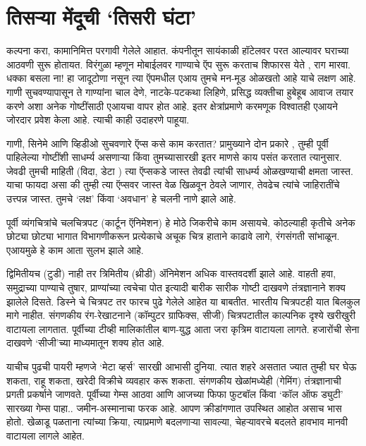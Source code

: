 \chapter{तिसऱ्या मेंदूची `तिसरी घंटा'}

कल्पना करा, कामानिमित्त परगावी गेलेले आहात. कंपनीतून सायंकाळी हॉटेलवर परत आल्यावर घराच्या आठवणी सुरू होतायत. विरंगुळा म्हणून मोबाईलवर गाण्याचे ऍप सुरू करताच शिफारस येते , राग मारवा.  धक्का बसला ना! हा जादूटोणा नसून त्या ऍपमधील एआय तुमचे मन-मूड ओळखतो आहे याचे लक्षण आहे. गाणी सुचवण्यापासून ते गाण्यांना चाल देणे, नाटके-पटकथा लिहिणे, प्रसिद्ध व्यक्तीचा हुबेहूब आवाज तयार करणे अशा अनेक गोष्टींसाठी एआयचा वापर होत आहे. इतर क्षेत्रांप्रमाणे करमणूक विश्वातही एआयने जोरदार प्रवेश केला आहे. त्याची काही उदाहरणे पाहूया.

गाणी, सिनेमे आणि व्हिडीओ सुचवणारे ऍप्स कसे काम करतात? प्रामुख्याने दोन प्रकारे , तुम्ही पूर्वी पाहिलेल्या गोष्टींशी साधर्म्य असणाऱ्या किंवा तुमच्यासारखी इतर माणसे काय पसंत करतात त्यानुसार. जेवढी तुमची माहिती (विदा, डेटा ) त्या ऍप्सकडे जास्त तेवढी त्यांची साधर्म्य ओळखण्याची क्षमता जास्त. याचा फायदा असा की तुम्ही त्या ऍप्सवर जास्त वेळ खिळवून ठेवले जाणार, तेवढेच त्यांचे जाहिरातींचे उत्त्पन्न जास्त. तुमचे `लक्ष' किंवा `अवधान' हे चलनी नाणे झाले आहे.  

पूर्वी व्यंगचित्रांचे चलचित्रपट (कार्टून ऍनिमेशन) हे मोठे जिकरीचे काम असायचे. कोठल्याही कृतीचे अनेक छोट्या छोट्या भागात विभागणीकरून प्रत्येकाचे अचूक चित्र हाताने काढावे लागे, रंगसंगती सांभाळून. एआयमुळे हे काम आता सुलभ झाले आहे. 

द्विमितीयच (टुडी) नाही तर त्रिमितीय (थ्रीडी) ॲनिमेशन अधिक वास्तवदर्शी झाले आहे. वाहती हवा, समुद्राच्या पाण्याचे तुषार, प्राण्यांच्या त्वचेचा पोत इत्यादी बारीक सारीक गोष्टी दाखवणे तंत्रज्ञानाने शक्य झालेले दिसते. डिस्ने चे चित्रपट तर फारच पुढे गेलेले आहेत या बाबतीत.  भारतीय चित्रपटही यात बिलकुल मागे नाहीत. संगणकीय रंग-रेखाटनाने (कॉम्पुटर ग्राफिक्स, सीजी) चित्रपटातील काल्पनिक दृश्ये खरीखुरी वाटायला लागतात. पूर्वीच्या टीव्ही मालिकांतील बाण-युद्ध आता जरा कृत्रिम वाटायला लागते. हजारोंची सेना दाखवणे `सीजी'च्या माध्यमातून शक्य होत आहे. 

याचीच पुढची पायरी म्हणजे `मेटा व्हर्स' सारखी आभासी दुनिया. त्यात शहरे असतात ज्यात तुम्ही घर घेऊ शकता, राहू शकता, खरेदी विक्रीचे व्यवहार करू शकता.  संगणकीय खेळांमध्येही (गेमिंग) तंत्रज्ञानाची प्रगती प्रकर्षाने जाणवते. पूर्वीच्या गेम्स आठवा आणि आजच्या फिफा फुटबॉल किंवा `कॉल ऑफ ड्युटी' सारख्या गेम्स पाहा.. जमीन-अस्मानाचा फरक आहे. आपण क्रीडांगणात उपस्थित आहोत असाच भास होतो. खेळाडू पळताना त्यांच्या क्रिया, त्याप्रमाणे बदलणाऱ्या सावल्या, चेहऱ्यावरचे बदलते हावभाव मानवी वाटायला लागले आहेत.

